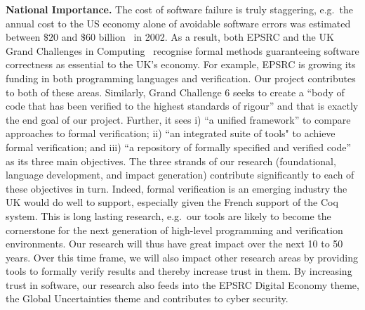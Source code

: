 \documentclass[a4paper,11pt]{article}
\newcommand{\eg}{{e.g.}\ }
\begin{document}
{\bf National Importance.}  The cost of software failure is truly
staggering, \eg the annual cost to the US economy alone of avoidable
software errors was estimated between $\$ 20$ and $\$60$
billion~\cite{grandchallenges} in 2002.  As a result, both EPSRC and
the UK Grand Challenges in Computing~\cite{grandchallenges} recognise
formal methods guaranteeing software correctness as essential to the
UK's economy. For example, EPSRC is growing its funding in both
programming languages and verification. Our project contributes to
both of these areas. Similarly, Grand Challenge 6 seeks to create a
``body of code that has been verified to the highest standards of
rigour'' and that is exactly the end goal of our project. Further, it
sees i) ``a unified framework'' to compare approaches to formal
verification; ii) ``an integrated suite of tools" to achieve formal
verification; and iii) ``a repository of formally specified and
verified code'' as its three main objectives. The three strands of our
research (foundational, language development, and impact generation)
contribute significantly to each of these objectives in turn.  Indeed,
formal verification is an emerging industry the UK would do well to
support, especially given the French support of the Coq system. This
is long lasting research, \eg our tools are likely to become the
cornerstone for the next generation of high-level programming and
verification environments. Our research will thus have great impact
over the next 10 to 50 years.  Over this time frame, we will also
impact other research areas by providing tools to formally verify
results and thereby increase trust in them. By increasing trust in
software, our research also feeds into the EPSRC Digital Economy
theme, the Global Uncertainties theme and contributes to cyber
security.
\end{document}
